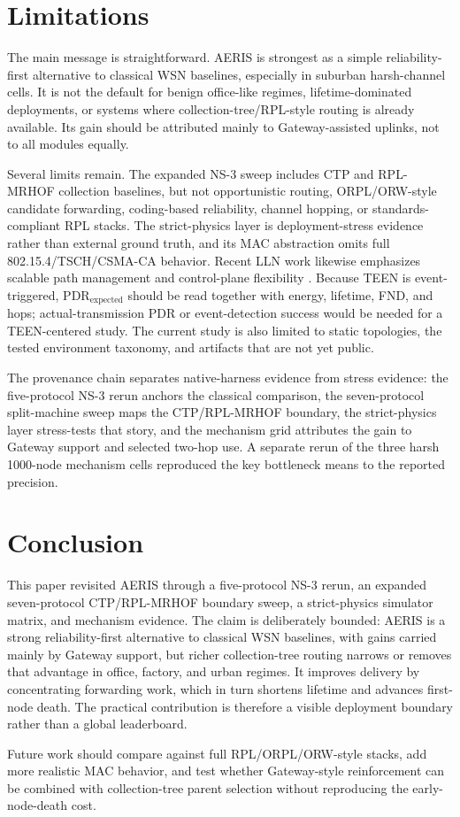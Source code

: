 \documentclass[conference]{IEEEtran}
\begin{document}
\section{Limitations}
The main message is straightforward. AERIS is strongest as a simple reliability-first alternative to classical WSN baselines, especially in suburban harsh-channel cells. It is not the default for benign office-like regimes, lifetime-dominated deployments, or systems where collection-tree/RPL-style routing is already available. Its gain should be attributed mainly to Gateway-assisted uplinks, not to all modules equally.

Several limits remain. The expanded NS-3 sweep includes CTP and RPL-MRHOF collection baselines, but not opportunistic routing, ORPL/ORW-style candidate forwarding, coding-based reliability, channel hopping, or standards-compliant RPL stacks. The strict-physics layer is deployment-stress evidence rather than external ground truth, and its MAC abstraction omits full 802.15.4/TSCH/CSMA-CA behavior. Recent LLN work likewise emphasizes scalable path management and control-plane flexibility \cite{almutairi2024survey,djennadi2025exploring}. Because TEEN is event-triggered, $\mathrm{PDR}_{\mathrm{expected}}$ should be read together with energy, lifetime, FND, and hops; actual-transmission PDR or event-detection success would be needed for a TEEN-centered study. The current study is also limited to static topologies, the tested environment taxonomy, and artifacts that are not yet public.

The provenance chain separates native-harness evidence from stress evidence: the five-protocol NS-3 rerun anchors the classical comparison, the seven-protocol split-machine sweep maps the CTP/RPL-MRHOF boundary, the strict-physics layer stress-tests that story, and the mechanism grid attributes the gain to Gateway support and selected two-hop use. A separate rerun of the three harsh 1000-node mechanism cells reproduced the key bottleneck means to the reported precision.

\section{Conclusion}
This paper revisited AERIS through a five-protocol NS-3 rerun, an expanded seven-protocol CTP/RPL-MRHOF boundary sweep, a strict-physics simulator matrix, and mechanism evidence. The claim is deliberately bounded: AERIS is a strong reliability-first alternative to classical WSN baselines, with gains carried mainly by Gateway support, but richer collection-tree routing narrows or removes that advantage in office, factory, and urban regimes. It improves delivery by concentrating forwarding work, which in turn shortens lifetime and advances first-node death. The practical contribution is therefore a visible deployment boundary rather than a global leaderboard.

Future work should compare against full RPL/ORPL/ORW-style stacks, add more realistic MAC behavior, and test whether Gateway-style reinforcement can be combined with collection-tree parent selection without reproducing the early-node-death cost.

\FloatBarrier
\balance


\end{document}
